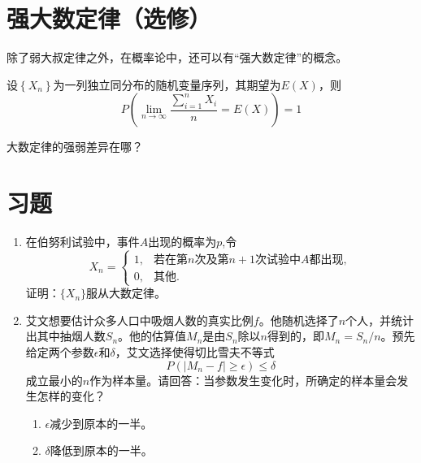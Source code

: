 \section{强大数定律（选修）}
除了弱大叔定律之外，在概率论中，还可以有“强大数定律”的概念。

\begin{theorem}[强大数定律]
设$\left \{ X_{n} \right \} $为一列独立同分布的随机变量序列，其期望为$E(X)$，则
$$P\left(\lim_{n \to \infty} \frac{ \sum_{i=1}^{n}X_{i} }{n}=E(X) \right)=1$$
\end{theorem}

\begin{problem}
    大数定律的强弱差异在哪？
\end{problem}
\begin{note}
    \vspace{2cm}
\end{note}
\section{习题}
\begin{enumerate}
    \item  在伯努利试验中，事件$A$出现的概率为$p$,令
$$
X_n = \left\{ 
\begin{matrix}
1, &  \text{若在第$n$次及第$n+1$次试验中$A$都出现},\\
0, &  \text{其他}.
\end{matrix} 
\right.
$$
证明：$\{X_n\}$服从大数定律。

\item  艾文想要估计众多人口中吸烟人数的真实比例$f$。他随机选择了$n$个人，并统计出其中抽烟人数$S_n$。他的估算值$M_n$是由$S_n$除以$n$得到的，即$M_n=S_n/n$。预先给定两个参数$\epsilon$和$\delta$，艾文选择使得切比雪夫不等式
$$
P(|M_n - f|\geq \epsilon ) \leq \delta
$$
成立最小的$n$作为样本量。请回答：当参数发生变化时，所确定的样本量会发生怎样的变化？
\begin{enumerate}
    \item $\epsilon$减少到原本的一半。
    \item $\delta$降低到原本的一半。
\end{enumerate}

\end{enumerate}